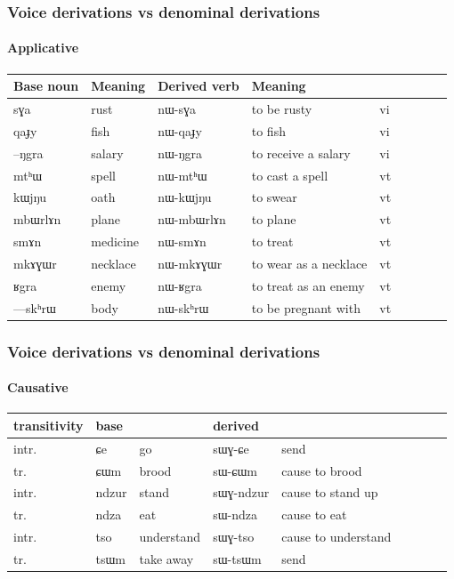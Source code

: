 \documentclass[xcolor=table]{beamer}
\newcommand{\ipa}[1]{{\phon \mbox{#1}}} %
\begin{document}
 \begin{frame} 
\frametitle{Voice derivations vs denominal derivations} 
\framesubtitle{Applicative} 
\begin{tabular}{lllllllll} \toprule
Base noun& Meaning & Derived verb & Meaning & \\
\midrule
\ipa{sɣa} &rust & \ipa{nɯ-sɣa} &to be rusty &vi\\
\ipa{qaɟy} &fish & \ipa{nɯ-qaɟy} &to fish &vi\\
\ipa{--ŋgra} &salary & \ipa{nɯ-ŋgra} &to receive a salary &vi\\
\midrule
\ipa{mtʰɯ} & spell& \ipa{nɯ-mtʰɯ} &to cast a spell &vt\\
\ipa{kɯjŋu} & oath& \ipa{nɯ-kɯjŋu} &to swear &vt\\
\ipa{mbɯrlɤn} &plane & \ipa{nɯ-mbɯrlɤn} &to plane    &vt\\
\ipa{smɤn} &medicine & \ipa{nɯ-smɤn} &to treat    &vt\\
\ipa{mkɤɣɯr} &necklace & \ipa{nɯ-mkɤɣɯr} &to wear as a necklace    &vt\\
\ipa{ʁgra} & enemy& \ipa{nɯ-ʁgra} & to treat as an enemy&vt\\
\ipa{---skʰrɯ} &body  & \ipa{nɯ-skʰrɯ} &to be pregnant with &vt\\
    \bottomrule
\end{tabular}
\end{frame}    
 
  \begin{frame} 
\frametitle{Voice derivations vs denominal derivations} 
\framesubtitle{Causative} 
 
 
\begin{tabular}{lllllllll} \toprule
 transitivity & base & & derived & \\
 \midrule
 intr. & \ipa{ɕe} & go & \ipa{sɯɣ-ɕe} & send \\
  tr. & \ipa{ɕɯm} & brood & \ipa{sɯ-ɕɯm} & cause to brood \\
  intr. & \ipa{ndzur} & stand & \ipa{sɯɣ-ndzur} & cause to stand up \\
  tr. & \ipa{ndza} & eat & \ipa{sɯ-ndza} & cause to eat \\ 
    intr. & \ipa{tso} & understand & \ipa{sɯɣ-tso} & cause to understand \\
  tr. & \ipa{tsɯm} & take away & \ipa{sɯ-tsɯm} &  send \\ 
 \bottomrule
\end{tabular}

\end{frame}    
 
\end{document}
